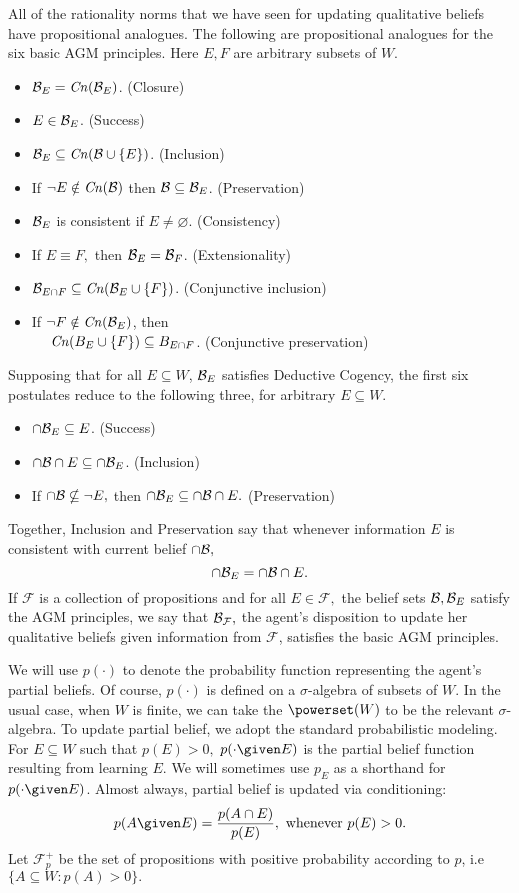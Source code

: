All of the rationality norms that we have seen for updating qualitative beliefs
have propositional analogues.  The following are propositional analogues for the
six basic AGM principles. Here $E,F$ are arbitrary subsets of $W$.
\begin{itemize}
\item[] $\mathcal{B}_E=\text{\textit{Cn}}(\mathcal{B}_E)$. \hfill(Closure)
\item[] $E\in \mathcal{B}_E$. \hfill(Success)
\item[] $\mathcal{B}_E \subseteq \text{\textit{Cn}}(\mathcal{B} \cup \{ E\})$. \hfill(Inclusion)
\item[] If $\neg E \notin \text{\textit{Cn}}(\mathcal{B})$ then $\mathcal{B} \subseteq \mathcal{B}_E$.
\hfill(Preservation)
\item[] $\mathcal{B}_E$ is consistent if $E\neq \varnothing$. \hfill(Consistency)
\item[] If $E\equiv F,$ then $\mathcal{B}_E = \mathcal{B}_F$. \hfill(Extensionality)
\item[] $\mathcal{B}_{E\cap F} \subseteq \text{\textit{Cn}}(\mathcal{B}_{E} \cup \{F\})$. \hfill(Conjunctive
inclusion)
\item[] If $\neg F \notin \text{\textit{Cn}}(\mathcal{B}_E)$, then\\$\phantom{M}$\hspace{1.5em}
$\text{\textit{Cn}}(B_E \cup \{F\}) \subseteq B_{E\cap F}$. \hfill(Conjunctive preservation)
\end{itemize}
Supposing that for all $E\subseteq W$, $\mathcal{B}_E$ satisfies Deductive Cogency, the
first six postulates reduce to the following three, for arbitrary $E\subseteq
W$.
\begin{itemize}
\item[] $\cap \mathcal{B}_E \subseteq E$. \hfill(Success)
\item[] $\cap \mathcal{B} \cap E \subseteq \cap \mathcal{B}_{E}$. \hfill(Inclusion)
\item[] If $\cap \mathcal{B} \nsubseteq \neg E,$ then $\cap \mathcal{B}_{E} \subseteq \cap
\mathcal{B} \cap E.$ \hfill(Preservation)
\end{itemize}
Together, Inclusion and Preservation say that whenever information $E$ is
consistent with  current belief $\cap \mathcal{B},$ $$\cap \mathcal{B}_E = \cap \mathcal{B} \cap E.$$
If $\mathcal{F}$ is a collection of propositions and for all $E\in \mathcal{F},$
the belief sets $\mathcal{B},\mathcal{B}_E$ satisfy the AGM principles, we say that
$\mathcal{B}_{\mathcal{F}},$ the agent's disposition to update her qualitative beliefs
given information from $\mathcal{F}$, satisfies the basic AGM principles.

We will use $p(\cdot)$ to denote the probability function representing the
agent's partial beliefs. Of course, $p(\cdot)$ is defined on a $\sigma$-algebra
of subsets of $W$. In the usual case, when $W$ is finite, we can take the
$\powerset(W)$ to be the relevant $\sigma$-algebra. To update partial belief, we
adopt the standard probabilistic modeling. For $E\subseteq W$ such that
$p(E)>0,$ $p(\cdot \given E)$ is the partial belief function resulting from
learning $E.$ We will sometimes use $p_E$ as a shorthand for $p(\cdot \given
E)$. Almost always, partial belief is updated via conditioning: $$p(A \given E)
= \frac{p(A\cap E)}{p(E)}, \text{ whenever } p(E)>0.$$ Let $\mathcal{F}_p^+$ be
the set of propositions with positive probability according to $p$, i.e $\{ A
\subseteq W : p(A)>0\}.$
